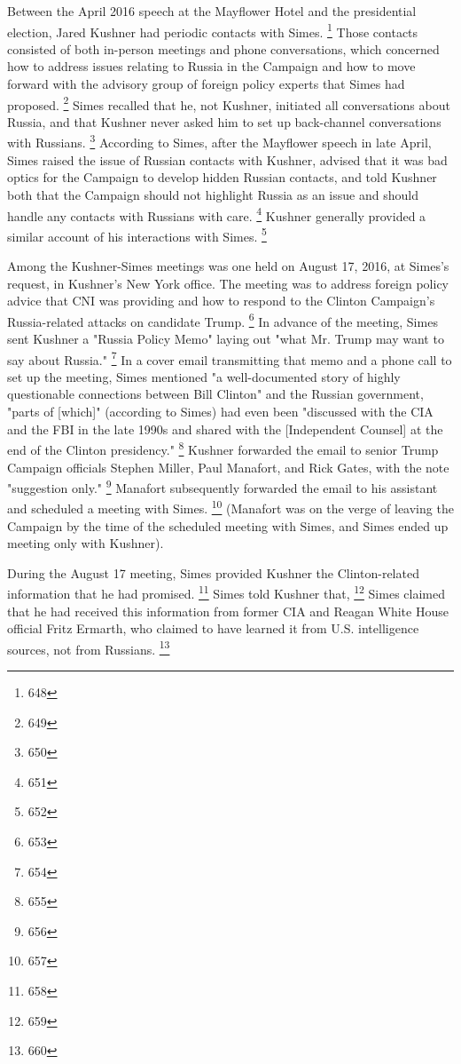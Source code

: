 Between the April 2016 speech at the Mayflower Hotel and the presidential election, Jared Kushner had periodic contacts with Simes.%
\footnote{648}
Those contacts consisted of both in-person meetings and phone conversations, which concerned how to address issues relating to Russia in the Campaign and how to move forward with the advisory group of foreign policy experts that Simes had proposed.%
\footnote{649}
Simes recalled that he, not Kushner, initiated all conversations about Russia, and that Kushner never asked him to set up back-channel conversations with Russians.%
\footnote{650}
According to Simes, after the Mayflower speech in late April, Simes raised the issue of Russian contacts with Kushner, advised that it was bad optics for the Campaign to develop hidden Russian contacts, and told Kushner both that the Campaign should not highlight Russia as an issue and should handle any contacts with Russians with care.%
\footnote{651}
Kushner generally provided a similar account of his interactions with Simes.%
\footnote{652}

Among the Kushner-Simes meetings was one held on August 17, 2016, at Simes's request, in Kushner's New York office.
The meeting was to address foreign policy advice that CNI was providing and how to respond to the Clinton Campaign's Russia-related attacks on candidate Trump.%
\footnote{653}
In advance of the meeting, Simes sent Kushner a "Russia Policy Memo" laying out "what Mr. Trump may want to say about Russia."%
\footnote{654}
In a cover email transmitting that memo and a phone call to set up the meeting, Simes mentioned "a well-documented story of highly questionable connections between Bill Clinton" and the Russian government, "parts of [which]" (according to Simes) had even been "discussed with the CIA and the FBI in the late 1990s and shared with the [Independent Counsel] at the end of the Clinton presidency."%
\footnote{655}
Kushner forwarded the email to senior Trump Campaign officials Stephen Miller, Paul Manafort, and Rick Gates, with the note "suggestion only."%
\footnote{656}
Manafort subsequently forwarded the email to his assistant and scheduled a meeting with Simes.%
\footnote{657}
(Manafort was on the verge of leaving the Campaign by the time of the scheduled meeting with Simes, and Simes ended up meeting only with Kushner).

During the August 17 meeting, Simes provided Kushner the Clinton-related information that he had promised.%
\footnote{658}
Simes told Kushner that,
\footnote{659}
Simes claimed that he had received this information from former CIA and Reagan White House official Fritz Ermarth, who claimed to have learned it from U.S. intelligence sources, not from Russians.%
\footnote{660}

